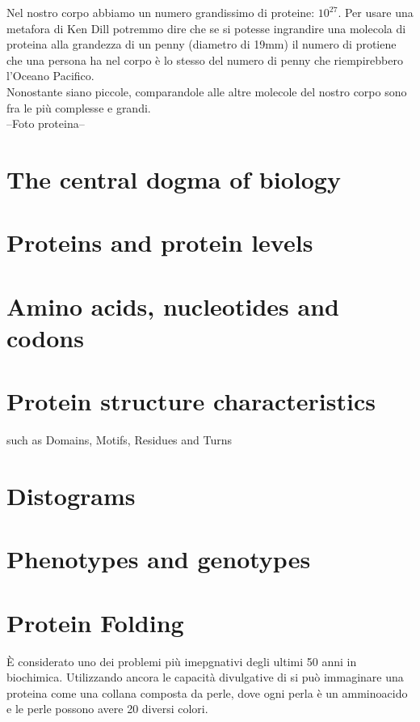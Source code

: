 Nel nostro corpo abbiamo un numero grandissimo di proteine: $10^{27}$. Per usare una metafora di Ken Dill \cite{TalksDill2013Oct} potremmo dire che se si potesse ingrandire una molecola di proteina alla grandezza di un penny (diametro di 19mm) il numero di protiene che una persona ha nel corpo è lo stesso del numero di penny che riempirebbero l'Oceano Pacifico.\\

Nonostante siano piccole, comparandole alle altre molecole del nostro corpo sono fra le più complesse e grandi.\\

--Foto proteina--\\

\section{The central dogma of biology}

\section{Proteins and protein levels}

\section{Amino acids, nucleotides and codons}

\section{Protein structure characteristics}
such as Domains, Motifs, Residues and Turns

\section{Distograms}

\section{Phenotypes and genotypes}

\section{Protein Folding}
È considerato uno dei problemi più imepgnativi degli ultimi 50 anni in biochimica.
Utilizzando ancora le capacità divulgative di \cite{TalksDill2013Oct} si può immaginare una proteina come una collana composta da perle, dove ogni perla è un amminoacido e le perle possono avere 20 diversi colori.

